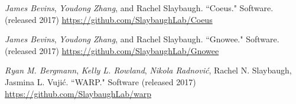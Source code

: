 \begin{bibsection}
\item \textit{James Bevins}, \textit{Youdong Zhang}, and Rachel Slaybaugh. ``Coeus." Software. (released 2017) \url{https://github.com/SlaybaughLab/Coeus} 

\item \textit{James Bevins}, \textit{Youdong Zhang}, and Rachel Slaybaugh. ``Gnowee." Software. (released 2017) \url{https://github.com/SlaybaughLab/Gnowee} 

\item \textit{Ryan M. Bergmann}, \textit{Kelly L. Rowland}, \textit{Nikola Radnovi\'c}, Rachel N. Slaybaugh, Jasmina L. Vuji\'c. ``WARP." Software (released 2017) \url{https://github.com/SlaybaughLab/warp}

\end{bibsection}


